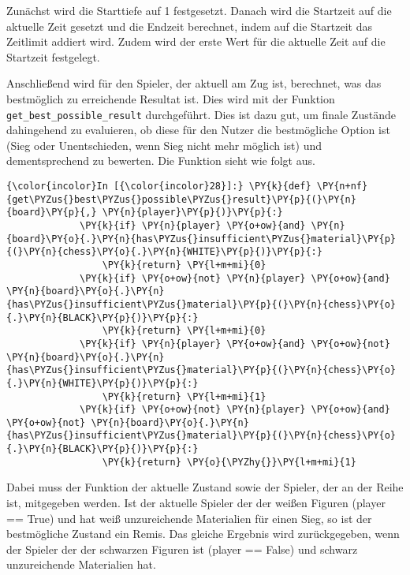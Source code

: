     Zunächst wird die Starttiefe auf 1 festgesetzt. Danach wird die
Startzeit auf die aktuelle Zeit gesetzt und die Endzeit berechnet, indem
auf die Startzeit das Zeitlimit addiert wird. Zudem wird der erste Wert
für die aktuelle Zeit auf die Startzeit festgelegt.

Anschließend wird für den Spieler, der aktuell am Zug ist, berechnet,
was das bestmöglich zu erreichende Resultat ist. Dies wird mit der
Funktion \texttt{get\_best\_possible\_result} durchgeführt. Dies ist
dazu gut, um finale Zustände dahingehend zu evaluieren, ob diese für den
Nutzer die bestmögliche Option ist (Sieg oder Unentschieden, wenn Sieg
nicht mehr möglich ist) und dementsprechend zu bewerten. Die Funktion
sieht wie folgt aus.

    \begin{Verbatim}[commandchars=\\\{\}]
{\color{incolor}In [{\color{incolor}28}]:} \PY{k}{def} \PY{n+nf}{get\PYZus{}best\PYZus{}possible\PYZus{}result}\PY{p}{(}\PY{n}{board}\PY{p}{,} \PY{n}{player}\PY{p}{)}\PY{p}{:}
             \PY{k}{if} \PY{n}{player} \PY{o+ow}{and} \PY{n}{board}\PY{o}{.}\PY{n}{has\PYZus{}insufficient\PYZus{}material}\PY{p}{(}\PY{n}{chess}\PY{o}{.}\PY{n}{WHITE}\PY{p}{)}\PY{p}{:}
                 \PY{k}{return} \PY{l+m+mi}{0}
             \PY{k}{if} \PY{o+ow}{not} \PY{n}{player} \PY{o+ow}{and} \PY{n}{board}\PY{o}{.}\PY{n}{has\PYZus{}insufficient\PYZus{}material}\PY{p}{(}\PY{n}{chess}\PY{o}{.}\PY{n}{BLACK}\PY{p}{)}\PY{p}{:}
                 \PY{k}{return} \PY{l+m+mi}{0}
             \PY{k}{if} \PY{n}{player} \PY{o+ow}{and} \PY{o+ow}{not} \PY{n}{board}\PY{o}{.}\PY{n}{has\PYZus{}insufficient\PYZus{}material}\PY{p}{(}\PY{n}{chess}\PY{o}{.}\PY{n}{WHITE}\PY{p}{)}\PY{p}{:}
                 \PY{k}{return} \PY{l+m+mi}{1}
             \PY{k}{if} \PY{o+ow}{not} \PY{n}{player} \PY{o+ow}{and} \PY{o+ow}{not} \PY{n}{board}\PY{o}{.}\PY{n}{has\PYZus{}insufficient\PYZus{}material}\PY{p}{(}\PY{n}{chess}\PY{o}{.}\PY{n}{BLACK}\PY{p}{)}\PY{p}{:}
                 \PY{k}{return} \PY{o}{\PYZhy{}}\PY{l+m+mi}{1}
\end{Verbatim}

    Dabei muss der Funktion der aktuelle Zustand sowie der Spieler, der an
der Reihe ist, mitgegeben werden. Ist der aktuelle Spieler der der
weißen Figuren (player == True) und hat weiß unzureichende Materialien
für einen Sieg, so ist der bestmögliche Zustand ein Remis. Das gleiche
Ergebnis wird zurückgegeben, wenn der Spieler der der schwarzen Figuren
ist (player == False) und schwarz unzureichende Materialien hat.

